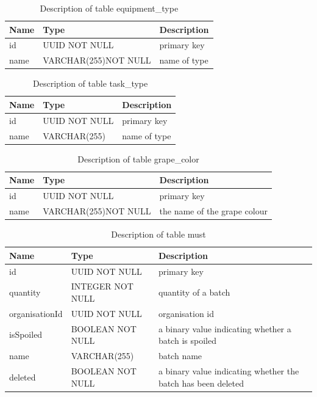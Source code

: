 \begin{table}[th]
	\centering
	\caption{Description of table equipment\_type}
	\begin{tabular}{|m{}|m{}|m{}|}
		\hline
		Name & Type & Description  \\
		\hline
		id & UUID NOT NULL & primary key \\ \hline
		name & VARCHAR(255)\newline NOT NULL & name of type \\ \hline
	\end{tabular}
\end{table}
\begin{table}[th]
	\centering
	\caption{Description of table task\_type}
	\begin{tabular}{|m{}|m{}|m{}|}
		\hline
		Name & Type & Description  \\
		\hline
		id & UUID NOT NULL & primary key \\ \hline
		name & VARCHAR(255) & name of type \\ \hline
	\end{tabular}
\end{table}
\begin{table}[th]
	\centering
	\caption{Description of table grape\_color}
	\begin{tabular}{|m{}|m{}|m{}|}
		\hline
		Name & Type & Description  \\
		\hline
		id & UUID NOT NULL & primary key\\ \hline
		name & VARCHAR(255)\newline NOT NULL & the name of the grape colour\\ \hline
	\end{tabular}
\end{table}
\begin{table}[th]
	\centering
	\caption{Description of table must}
	\begin{tabular}{|m{}|m{}|m{}|}
		\hline
		Name & Type & Description  \\ \hline
		id & UUID NOT NULL & primary key\\ \hline
		quantity & INTEGER NOT NULL & quantity of a batch\\ \hline
		organisationId & UUID NOT NULL & organisation id\\ \hline
		isSpoiled & BOOLEAN NOT NULL & a binary value indicating whether a batch is spoiled\\ \hline
		name & VARCHAR(255) & batch name\\ \hline
		deleted & BOOLEAN NOT NULL & a binary value indicating whether the batch has been deleted\\ \hline
	\end{tabular}
\end{table}
